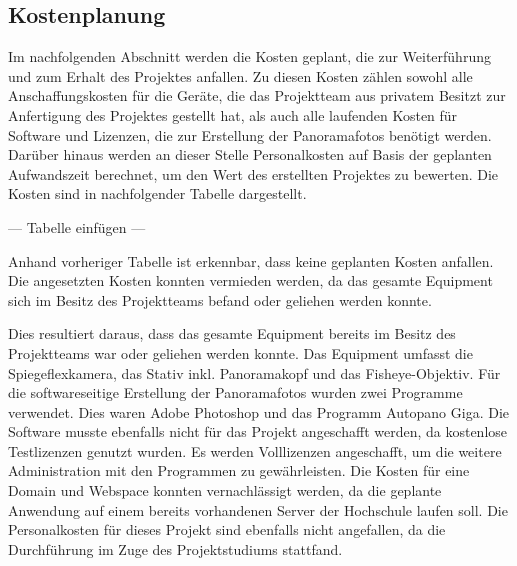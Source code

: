 \subsection{Kostenplanung}
\label{sec:Kostenplanung}

Im nachfolgenden Abschnitt werden die Kosten geplant, die zur Weiterführung und zum Erhalt des Projektes anfallen. Zu 
diesen Kosten zählen sowohl alle Anschaffungskosten für die Geräte, die das Projektteam aus privatem Besitzt zur 
Anfertigung des Projektes gestellt hat, als auch alle laufenden Kosten für Software und Lizenzen, die zur Erstellung der 
Panoramafotos benötigt werden. 
Darüber hinaus werden an dieser Stelle Personalkosten auf Basis der geplanten Aufwandszeit berechnet, um den Wert des 
erstellten Projektes zu bewerten.
Die Kosten sind in nachfolgender Tabelle dargestellt.

--- Tabelle einfügen ---

Anhand vorheriger Tabelle ist erkennbar, dass keine geplanten Kosten anfallen.
Die angesetzten Kosten konnten vermieden werden, da das gesamte Equipment sich im Besitz des Projektteams befand oder 
geliehen werden konnte.

Dies resultiert daraus, dass das gesamte Equipment bereits im Besitz des Projektteams war oder geliehen werden konnte. Das 
Equipment umfasst die Spiegeflexkamera, das Stativ inkl. Panoramakopf und das Fisheye-Objektiv. Für die softwareseitige 
Erstellung der Panoramafotos wurden zwei Programme verwendet. Dies waren Adobe Photoshop und das Programm Autopano Giga. 
Die Software musste ebenfalls nicht für das Projekt angeschafft werden, da kostenlose Testlizenzen genutzt wurden. Es 
werden Volllizenzen angeschafft, um die weitere Administration mit den Programmen zu gewährleisten.
Die Kosten für eine Domain und Webspace konnten vernachlässigt werden, da die geplante Anwendung auf einem bereits 
vorhandenen Server der Hochschule laufen soll.
Die Personalkosten für dieses Projekt sind ebenfalls nicht angefallen, da die Durchführung im Zuge des Projektstudiums 
stattfand.